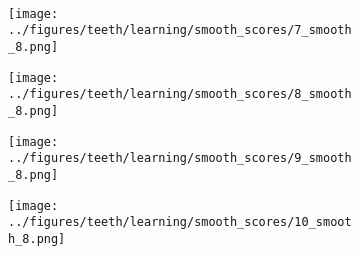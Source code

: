 \begin{figure}[h!]
	\vspace{-0.35cm}
	\\
	\begin{subfigure}{0.16\textwidth}
		\centering
		\texttt{[image: ../figures/teeth/learning/smooth\_scores/7\_smooth\_8.png]}
		\label{fig:1}
	\end{subfigure}
	\begin{subfigure}{0.16\textwidth}
		\centering
		\texttt{[image: ../figures/teeth/learning/smooth\_scores/8\_smooth\_8.png]}
		\label{fig:1}
	\end{subfigure}
	\begin{subfigure}{0.16\textwidth}
		\centering
		\texttt{[image: ../figures/teeth/learning/smooth\_scores/9\_smooth\_8.png]}
		\label{fig:1}
	\end{subfigure}
	\begin{subfigure}{0.16\textwidth}
		\centering
		\texttt{[image: ../figures/teeth/learning/smooth\_scores/10\_smooth\_8.png]}

\end{subfigure}
\end{figure}
